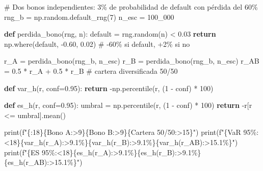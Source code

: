 \documentclass[
  spanish,
  letterpaper,
  DIV=11,
  numbers=noendperiod]{scrreprt}
\newenvironment{Shaded}{\begin{snugshade}}{\end{snugshade}}
\newcommand{\BuiltInTok}[1]{\textcolor[rgb]{0.00,0.23,0.31}{#1}}
\newcommand{\CommentTok}[1]{\textcolor[rgb]{0.37,0.37,0.37}{#1}}
\newcommand{\ControlFlowTok}[1]{\textcolor[rgb]{0.00,0.23,0.31}{\textbf{#1}}}
\newcommand{\DecValTok}[1]{\textcolor[rgb]{0.68,0.00,0.00}{#1}}
\newcommand{\FloatTok}[1]{\textcolor[rgb]{0.68,0.00,0.00}{#1}}
\newcommand{\KeywordTok}[1]{\textcolor[rgb]{0.00,0.23,0.31}{\textbf{#1}}}
\newcommand{\NormalTok}[1]{\textcolor[rgb]{0.00,0.23,0.31}{#1}}
\newcommand{\OperatorTok}[1]{\textcolor[rgb]{0.37,0.37,0.37}{#1}}
\newcommand{\SpecialCharTok}[1]{\textcolor[rgb]{0.37,0.37,0.37}{#1}}
\newcommand{\SpecialStringTok}[1]{\textcolor[rgb]{0.13,0.47,0.30}{#1}}
\newcommand{\StringTok}[1]{\textcolor[rgb]{0.13,0.47,0.30}{#1}}
\begin{document}
\label{subaditividad}
\begin{Shaded}
\begin{Highlighting}[]
\CommentTok{\# Dos bonos independientes: 3\% de probabilidad de default con pérdida del 60\%}
\NormalTok{rng\_b }\OperatorTok{=}\NormalTok{ np.random.default\_rng(}\DecValTok{7}\NormalTok{)}
\NormalTok{n\_esc }\OperatorTok{=} \DecValTok{100\_000}

\KeywordTok{def}\NormalTok{ perdida\_bono(rng, n):}
\NormalTok{    default }\OperatorTok{=}\NormalTok{ rng.random(n) }\OperatorTok{\textless{}} \FloatTok{0.03}
    \ControlFlowTok{return}\NormalTok{ np.where(default, }\OperatorTok{{-}}\FloatTok{0.60}\NormalTok{, }\FloatTok{0.02}\NormalTok{)   }\CommentTok{\# {-}60\% si default, +2\% si no}

\NormalTok{r\_A }\OperatorTok{=}\NormalTok{ perdida\_bono(rng\_b, n\_esc)}
\NormalTok{r\_B }\OperatorTok{=}\NormalTok{ perdida\_bono(rng\_b, n\_esc)}
\NormalTok{r\_AB }\OperatorTok{=} \FloatTok{0.5} \OperatorTok{*}\NormalTok{ r\_A }\OperatorTok{+} \FloatTok{0.5} \OperatorTok{*}\NormalTok{ r\_B                }\CommentTok{\# cartera diversificada 50/50}

\KeywordTok{def}\NormalTok{ var\_h(r, conf}\OperatorTok{=}\FloatTok{0.95}\NormalTok{):}
    \ControlFlowTok{return} \OperatorTok{{-}}\NormalTok{np.percentile(r, (}\DecValTok{1} \OperatorTok{{-}}\NormalTok{ conf) }\OperatorTok{*} \DecValTok{100}\NormalTok{)}

\KeywordTok{def}\NormalTok{ es\_h(r, conf}\OperatorTok{=}\FloatTok{0.95}\NormalTok{):}
\NormalTok{    umbral }\OperatorTok{=}\NormalTok{ np.percentile(r, (}\DecValTok{1} \OperatorTok{{-}}\NormalTok{ conf) }\OperatorTok{*} \DecValTok{100}\NormalTok{)}
    \ControlFlowTok{return} \OperatorTok{{-}}\NormalTok{r[r }\OperatorTok{\textless{}=}\NormalTok{ umbral].mean()}

\BuiltInTok{print}\NormalTok{(}\SpecialStringTok{f"}\SpecialCharTok{\{}\StringTok{\textquotesingle{}\textquotesingle{}}\SpecialCharTok{:18\}\{}\StringTok{\textquotesingle{}Bono A\textquotesingle{}}\SpecialCharTok{:\textgreater{}9\}\{}\StringTok{\textquotesingle{}Bono B\textquotesingle{}}\SpecialCharTok{:\textgreater{}9\}\{}\StringTok{\textquotesingle{}Cartera 50/50\textquotesingle{}}\SpecialCharTok{:\textgreater{}15\}}\SpecialStringTok{"}\NormalTok{)}
\BuiltInTok{print}\NormalTok{(}\SpecialStringTok{f"}\SpecialCharTok{\{}\StringTok{\textquotesingle{}VaR 95\%\textquotesingle{}}\SpecialCharTok{:\textless{}18\}\{}\NormalTok{var\_h(r\_A)}\SpecialCharTok{:\textgreater{}9.1\%\}\{}\NormalTok{var\_h(r\_B)}\SpecialCharTok{:\textgreater{}9.1\%\}\{}\NormalTok{var\_h(r\_AB)}\SpecialCharTok{:\textgreater{}15.1\%\}}\SpecialStringTok{"}\NormalTok{)}
\BuiltInTok{print}\NormalTok{(}\SpecialStringTok{f"}\SpecialCharTok{\{}\StringTok{\textquotesingle{}ES  95\%\textquotesingle{}}\SpecialCharTok{:\textless{}18\}\{}\NormalTok{es\_h(r\_A)}\SpecialCharTok{:\textgreater{}9.1\%\}\{}\NormalTok{es\_h(r\_B)}\SpecialCharTok{:\textgreater{}9.1\%\}\{}\NormalTok{es\_h(r\_AB)}\SpecialCharTok{:\textgreater{}15.1\%\}}\SpecialStringTok{"}\NormalTok{)}
\end{Highlighting}
\end{Shaded}
\end{document}
